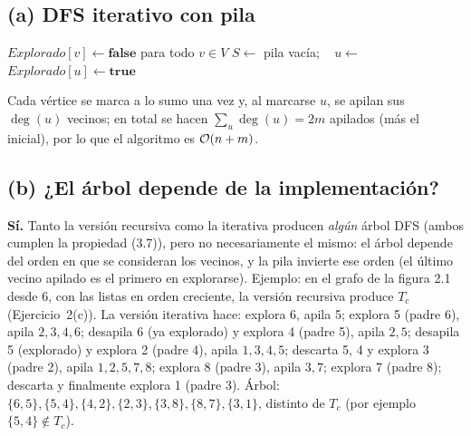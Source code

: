 \subsection*{(a) DFS iterativo con pila}
\begin{algorithm}[H]
\caption{DFS iterativo (versión del libro)}
\begin{algorithmic}[1]
  \State $Explorado[v]\gets\textbf{false}$ para todo $v\in V$
  \State $S\gets$ pila vacía; \ 
    \State $u\gets$ 
      \State $Explorado[u]\gets\textbf{true}$
        \State {}
      \EndFor
    \EndIf
  \EndWhile
\EndFunction
\end{algorithmic}
\end{algorithm}
Cada vértice se marca a lo sumo una vez y, al marcarse $u$, se apilan sus $\deg(u)$ vecinos; en
total se hacen $\sum_u\deg(u)=2m$ apilados (más el inicial), por lo que el algoritmo es $\mathcal{O}(n+m)$.

\subsection*{(b) ¿El árbol depende de la implementación?}
\textbf{Sí.} Tanto la versión recursiva como la iterativa producen \emph{algún} árbol DFS (ambos
cumplen la propiedad (3.7)), pero no necesariamente el mismo: el árbol depende del orden en que se
consideran los vecinos, y la pila invierte ese orden (el último vecino apilado es el primero en
explorarse). Ejemplo: en el grafo de la figura 2.1 desde 6, con las listas en orden creciente, la
versión recursiva produce $T_c$ (Ejercicio~2(c)). La versión iterativa hace: explora 6, apila 5;
explora 5 (padre 6), apila $2,3,4,6$; desapila 6 (ya explorado) y explora 4 (padre 5), apila $2,5$;
desapila 5 (explorado) y explora 2 (padre 4), apila $1,3,4,5$; descarta 5, 4 y explora 3 (padre 2),
apila $1,2,5,7,8$; explora 8 (padre 3), apila $3,7$; explora 7 (padre 8); descarta y finalmente
explora 1 (padre 3). Árbol: $\{6,5\},\{5,4\},\{4,2\},\{2,3\},\{3,8\},\{8,7\},\{3,1\}$, distinto de
$T_c$ (por ejemplo $\{5,4\}\notin T_c$).

